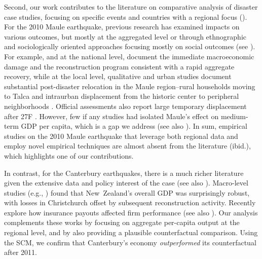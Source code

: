 \documentclass[12pt]{article}
\begin{document}
Second, our work contributes to the literature on comparative analysis of disaster case studies, focusing on specific events and countries with a regional focus (\cite{barone2014natural, farzanegan2025bam, porcelli2019impact}). For the 2010 Maule earthquake, previous research has examined impacts on various outcomes, but mostly at the aggregated level or through ethnographic and sociologically oriented approaches focusing mostly on social outcomes (see \cite{cardenasjiron2012chilean, eclac2010overview, cardenas2018talca, dussaillant2014trust}). For example, and at the national level, \textcite{eclac2010overview} document the immediate macroeconomic damage and the reconstruction program consistent with a rapid aggregate recovery, while at the local level, qualitative and urban studies document substantial post-disaster relocation in the Maule region--rural households moving to Talca and intraurban displacement from the historic center to peripheral neighborhoods \parencite{micheletti2017relocalizacion, cardenas2018talca}. Official assessments also report large temporary displacement after 27F \parencite{usgs2011ofr}. However, few if any studies had isolated Maule's effect on medium-term GDP per capita, which is a gap we address (see also \cite{aguirre2023medium}). In sum, empirical studies on the 2010 Maule earthquake that leverage both regional data and employ novel empirical techniques are almost absent from the literature (ibid.), which highlights one of our contributions.   

In contrast, for the Canterbury earthquakes, there is a much richer literature given the extensive data and policy interest of the case (see also \cite{miller2013estimating}). Macro-level studies (e.g., \cite{doyle2015short, parker2016five}) found that New Zealand’s overall GDP was surprisingly robust, with losses in Christchurch offset by subsequent reconstruction activity. Recently \textcite{poontirakul2017insurance} explore how insurance payouts affected firm performance (see also \cite{nguyen2020insurance}). Our analysis complements these works by focusing on aggregate per-capita output at the regional level, and by also providing a plausible counterfactual comparison. Using the SCM, we confirm that Canterbury’s economy \textit{outperformed} its counterfactual after 2011.
\end{document}
